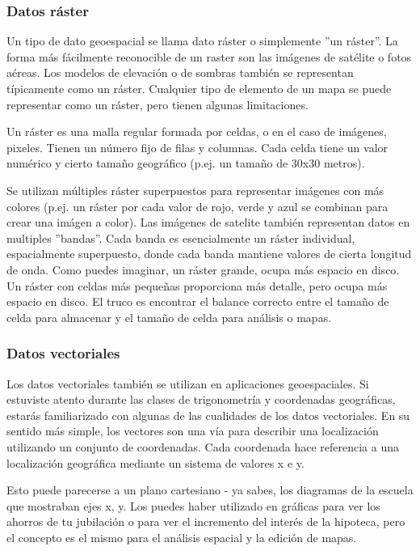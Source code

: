 \subsubsection{Datos ráster}\label{label_rasterdata}

Un tipo de dato geoespacial se llama dato ráster o simplemente ''un ráster''. 
La forma más fácilmente reconocible de un raster son las imágenes de satélite
o fotos aéreas. Los modelos de elevación o de sombras también se representan 
típicamente como un ráster. Cualquier tipo de elemento de un mapa se puede 
representar como un ráster, pero tienen algunas limitaciones.

Un ráster es una malla regular formada por celdas, o en el caso de imágenes, 
pixeles. Tienen un número fijo de filas y columnas. Cada celda tiene un valor 
numérico y cierto tamaño geográfico (p.ej. un tamaño de 30x30 metros).

Se utilizan múltiples ráster superpuestos para representar imágenes con más 
colores (p.ej. un ráster por cada valor de rojo, verde y azul se combinan para 
crear una imágen a color). Las imágenes de satelite también representan datos 
en multiples ''bandas''. Cada banda es esencialmente un ráster individual,
espacialmente superpuesto, donde cada banda mantiene valores de cierta longitud
de onda. Como puedes imaginar, un ráster grande, ocupa más espacio en disco. 
Un ráster con celdas más pequeñas proporciona más detalle, pero ocupa más 
espacio en disco. El truco es encontrar el balance correcto entre el tamaño 
de celda para almacenar y el tamaño de celda para análisis o mapas.

\subsubsection{Datos vectoriales}\label{label_vectordata}

Los datos vectoriales también se utilizan en aplicaciones geoespaciales. 
Si estuviste atento durante las clases de trigonometría y coordenadas 
geográficas, estarás familiarizado con algunas de las cualidades de los datos 
vectoriales. En su sentido más simple, los vectores son una vía para describir 
una localización utilizando un conjunto de coordenadas. Cada coordenada hace 
referencia a una localización geográfica mediante un sistema de valores x e y.

Esto puede parecerse a un plano cartesiano - ya sabes, los diagramas de la 
escuela que mostraban ejes x, y. Los puedes haber utilizado en gráficas para 
ver los ahorros de tu jubilación o para ver el incremento del interés de la 
hipoteca, pero el concepto es el mismo para el análisis espacial y la edición 
de mapas.

